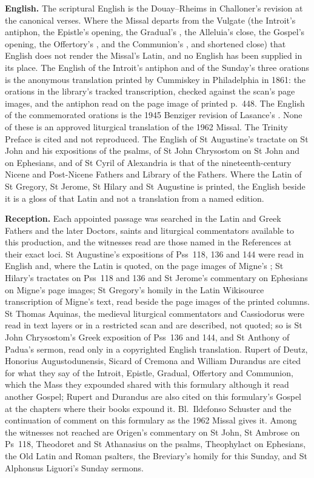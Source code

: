 {\textbf{English.} The scriptural English is the Douay--Rheims in Challoner's
revision at the canonical verses. Where the Missal departs from the Vulgate (the
Introit's antiphon, the Epistle's opening, the Gradual's , the
Alleluia's close, the Gospel's opening, the Offertory's , and the
Communion's ,  and shortened close) that English
does not render the Missal's Latin, and no English has been supplied in its
place. The English of the Introit's antiphon and of the Sunday's three orations
is the anonymous translation printed by Cummiskey in Philadelphia in 1861: the
orations in the library's tracked transcription, checked against the scan's page
images, and the antiphon read on the page image of printed p.~448. The English
of the commemorated orations is the 1945 Benziger revision of Lasance's
. None of these is an approved liturgical translation
of the 1962 Missal. The Trinity Preface is cited and not reproduced. The
English of St Augustine's tractate on St John and his expositions of the
psalms, of St John Chrysostom on St John and on Ephesians, and of St Cyril of
Alexandria is that of the nineteenth-century Nicene and Post-Nicene Fathers and
Library of the Fathers. Where the Latin of St Gregory, St Jerome, St Hilary and
St Augustine is printed, the English beside it is a gloss of that Latin and not
a translation from a named edition.

\textbf{Reception.} Each appointed passage was searched in the Latin and Greek
Fathers and the later Doctors, saints and liturgical commentators available to
this production, and the witnesses read are those named in the References at
their exact loci. St Augustine's expositions of Pss~118, 136 and 144 were read in
English and, where the Latin is quoted, on the page images of Migne's
; St Hilary's tractates on Pss~118 and 136 and St
Jerome's commentary on Ephesians on Migne's page images; St Gregory's homily in
the Latin Wikisource transcription of Migne's text, read beside the page images
of the printed columns. St Thomas Aquinas, the medieval liturgical commentators
and Cassiodorus were read in text layers or in a restricted scan and are
described, not quoted; so is St John Chrysostom's Greek exposition of
Pss~136 and 144, and St Anthony of Padua's sermon, read only in a copyrighted
English translation. Rupert of Deutz, Honorius Augustodunensis, Sicard of
Cremona and William Durandus are cited for what they say of the Introit,
Epistle, Gradual, Offertory and Communion, which the Mass they expounded shared
with this formulary although it read another Gospel; Rupert and Durandus are
also cited on this formulary's Gospel at the chapters where their books
expound it. Bl.\ Ildefonso
Schuster and the continuation of  comment on this
formulary as the 1962 Missal gives it. Among the witnesses not reached are
Origen's commentary on St John, St Ambrose on Ps~118, Theodoret and St
Athanasius on the psalms, Theophylact on Ephesians, the Old Latin and Roman
psalters, the Breviary's homily for this Sunday, and St Alphonsus Liguori's
Sunday sermons.

}

